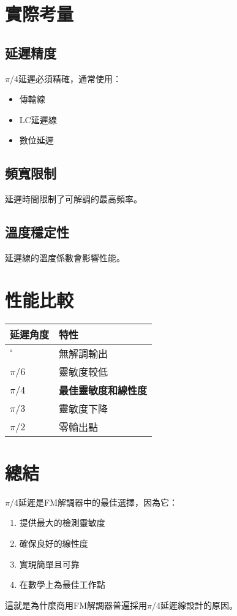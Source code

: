 \documentclass{article}
\begin{document}
\section{實際考量}

\subsection{延遲精度}
$\pi$/4延遲必須精確，通常使用：
\begin{itemize}
    \item 傳輸線
    \item LC延遲線
    \item 數位延遲
\end{itemize}

\subsection{頻寬限制}
延遲時間限制了可解調的最高頻率。

\subsection{溫度穩定性}
延遲線的溫度係數會影響性能。

\section{性能比較}

\begin{center}
\begin{tabular}{>{\centering\arraybackslash}m{3cm} >{\raggedright\arraybackslash}m{8cm}}
\toprule
\textbf{延遲角度} & \textbf{特性} \\
\midrule
0$^{\circ}$ & 無解調輸出 \\
$\pi$/6 & 靈敏度較低 \\
$\pi$/4 & \textbf{最佳靈敏度和線性度} \\
$\pi$/3 & 靈敏度下降 \\
$\pi$/2 & 零輸出點 \\
\bottomrule
\end{tabular}
\end{center}

\section{總結}

$\pi$/4延遲是FM解調器中的最佳選擇，因為它：
\begin{enumerate}
    \item 提供最大的檢測靈敏度
    \item 確保良好的線性度
    \item 實現簡單且可靠
    \item 在數學上為最佳工作點
\end{enumerate}

這就是為什麼商用FM解調器普遍採用$\pi$/4延遲線設計的原因。
\end{document}
